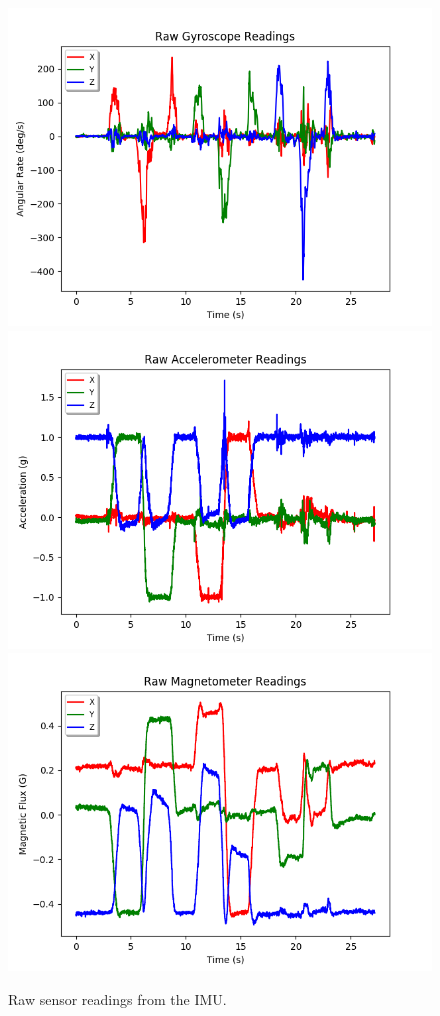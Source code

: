 \documentclass[11pt]{article}
\begin{document}
\begin{figure}[htp]

\centering
\includegraphics[width=.32\textwidth]{gyro-unaltered}\hfill
\includegraphics[width=.32\textwidth]{acc-unaltered}\hfill
\includegraphics[width=.32\textwidth]{mag-unaltered}

\caption{Raw sensor readings from the IMU.}
\label{fig:figure3}

\end{figure}
\end{document}
